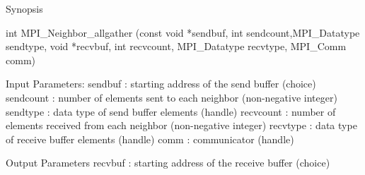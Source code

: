 Synopsis

int MPI_Neighbor_allgather
   (const void *sendbuf, int sendcount,MPI_Datatype sendtype,
    void *recvbuf, int recvcount, MPI_Datatype recvtype,
    MPI_Comm comm)

Input Parameters:
sendbuf : starting address of the send buffer (choice)
sendcount : number of elements sent to each neighbor (non-negative integer)
sendtype : data type of send buffer elements (handle)
recvcount : number of elements received from each neighbor (non-negative integer)
recvtype : data type of receive buffer elements (handle)
comm : communicator (handle)

Output Parameters
recvbuf : starting address of the receive buffer (choice)
